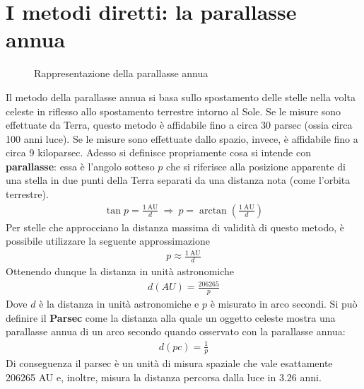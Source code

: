 \documentclass[a4paper, oneside]{book}
\begin{document}
\section{I metodi diretti: la parallasse annua}
\begin{figure}
    \centering
    \caption{Rappresentazione della parallasse annua}
\end{figure}
Il metodo della parallasse annua si basa sullo spostamento delle stelle nella volta celeste 
in riflesso allo spostamento terrestre intorno al Sole. Se le misure sono effettuate da Terra, questo 
metodo è affidabile fino a circa 30 parsec (ossia circa 100 anni luce). Se le misure sono effettuate dallo spazio, 
invece, è affidabile fino a circa 9 kiloparsec. Adesso si definisce propriamente cosa si intende 
con \textbf{parallasse}: essa è l'angolo sotteso $p$ che si riferisce alla posizione apparente di 
una stella in due punti della Terra separati da una distanza nota (come l'orbita
terrestre). 
\begin{gather*}
    \tan p = \frac{1 \ \text{AU}}{d} \ \Longrightarrow \ p = \arctan\left(\frac{1 \ \text{AU}}{d}\right)
\end{gather*} 
Per stelle che approcciano la distanza massima di validità di questo metodo, è possibile 
utilizzare la seguente approssimazione 
\begin{gather*}
    p \approx \frac{1 \ \text{AU}}{d}
\end{gather*}
Ottenendo dunque la distanza in unità astronomiche
\begin{align}
    d(AU) = \frac{206265}{p}
\end{align}
Dove $d$ è la distanza in unità astronomiche e $p$ è misurato in arco secondi. Si può
definire il \textbf{Parsec} come la distanza alla quale un oggetto celeste
mostra una parallasse annua di un arco secondo quando osservato
con la parallasse annua:
\begin{gather*}
    d(pc) = \frac{1}{p}
\end{gather*}
Di conseguenza il parsec è un unità di misura spaziale che vale esattamente 206265 AU e,
inoltre, misura la distanza percorsa dalla luce in $3.26$ anni.
\end{document}
